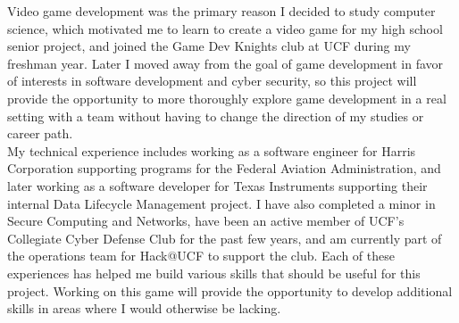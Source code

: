 Video game development was the primary reason I decided to study computer
science, which motivated me to learn to create a video game for my high school
senior project, and joined the Game Dev Knights club at UCF during my freshman
year. Later I moved away from the goal of game development in favor of interests
in software development and cyber security, so this project will provide the
opportunity to more thoroughly explore game development in a real setting with a
team without having to change the direction of my studies or career path.\\

My technical experience includes working as a software engineer for Harris
Corporation supporting programs for the Federal Aviation Administration, and
later working as a software developer for Texas Instruments supporting their
internal Data Lifecycle Management project. I have also completed a minor in
Secure Computing and Networks, have been an active member of UCF’s Collegiate
Cyber Defense Club for the past few years, and am currently part of the
operations team for Hack@UCF to support the club. Each of these experiences has
helped me build various skills that should be useful for this project. Working
on this game will provide the opportunity to develop additional skills in areas
where I would otherwise be lacking.

